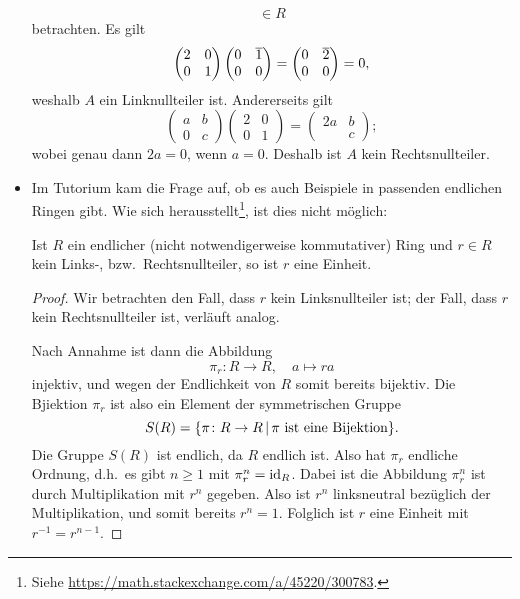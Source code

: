 \begin{itemize}
\[      \in       R
    \]
    betrachten.
    Es gilt
    \[
        \begin{pmatrix}
          2 & 0 \\
          0 & 1
        \end{pmatrix}
        \begin{pmatrix}
          0 & \overline{1} \\
          0 & 0
        \end{pmatrix}
      = \begin{pmatrix}
          0 & \overline{2} \\
          0 & 0
        \end{pmatrix}
      = 0,
    \]
    weshalb $A$ ein Linknullteiler ist.
    Andererseits gilt
    \[
        \begin{pmatrix}
          a & b \\
          0 & c
        \end{pmatrix}
        \begin{pmatrix}
          2 & 0 \\
          0 & 1
        \end{pmatrix}
      = \begin{pmatrix}
          2a  & b \\
              & c
        \end{pmatrix};
    \]
    wobei genau dann $2a = 0$, wenn $a = 0$.
    Deshalb ist $A$ kein Rechtsnullteiler.
    
  \item
    Im Tutorium kam die Frage auf, ob es auch Beispiele in passenden endlichen Ringen gibt.
    Wie sich herausstellt\footnote{Siehe \url{https://math.stackexchange.com/a/45220/300783}.}, ist dies nicht möglich:
    
    \begin{lemma}
      \label{lemma: non zero divisors are units}
      Ist $R$ ein endlicher \textup(nicht notwendigerweise kommutativer\textup) Ring und $r \in R$ kein Links-, bzw.\ Rechtsnullteiler, so ist $r$ eine Einheit.
    \end{lemma}
    
    \begin{proof}
      Wir betrachten den Fall, dass $r$ kein Linksnullteiler ist;
      der Fall, dass $r$ kein Rechtsnullteiler ist, verläuft analog.
      
      Nach Annahme ist dann die Abbildung
      \[
                \pi_r
        \colon  R
        \to     R,
        \quad   a
        \mapsto ra
      \]
      injektiv, und wegen der Endlichkeit von $R$ somit bereits bijektiv.
      Die Bjiektion $\pi_r$ ist also ein Element der symmetrischen Gruppe
      \[
          S(R)
        = \{
            \pi \colon R \to R
          \suchthat
          \text{$\pi$ ist eine Bijektion}
          \}.
      \]
      Die Gruppe $S(R)$ ist endlich, da $R$ endlich ist.
      Also hat $\pi_r$ endliche Ordnung, d.h.\ es gibt $n \geq 1$ mit $\pi_r^n = \operatorname{id}_R$.
      Dabei ist die Abbildung $\pi_r^n$ ist durch Multiplikation mit $r^n$ gegeben.
      Also ist $r^n$ linksneutral bezüglich der Multiplikation, und somit bereits $r^n = 1$.
      Folglich ist $r$ eine Einheit mit $r^{-1} = r^{n-1}$.
    \end{proof}


\end{itemize}
